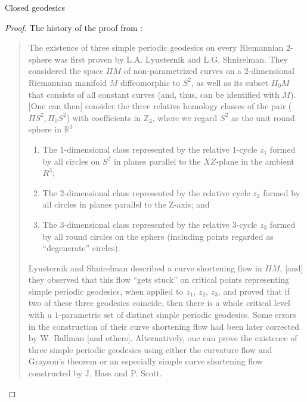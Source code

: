 \documentclass{article}
\theoremstyle{definition}
\theoremstyle{remark}
\begin{document}
\begin{section}{Closed geodesics}
  \begin{proof}
    The history of the proof from \cite{Liokumovich}:
    \begin{quote}
      The existence of three simple periodic geodesics on every Riemannian 2-sphere
      was first proven by L.A. Lyusternik and L.G. Shnirelman. They considered
      the space $\Pi M$ of non-parametrized curves on a $2$-dimensional
      Riemannian manifold $M$ diffeomorphic to $S^2$, as well as its subset
      $\Pi_0M$ that consists of all constant curves (and, thus, can be
      identified with $M$). [One can then] consider the three relative homology
      classes of the pair ($\Pi S^2, \Pi_0S^2$) with coefficients in
      $\mathbb Z_2$, where we regard $S^2$ as the unit round sphere in $\mathbb R^3$
      \begin{enumerate}[1)]
        \item The $1$-dimensional class represented by the relative $1$-cycle $z_1$
        formed by all circles on $S^2$ in planes parallel to the $XZ$-plane in
        the ambient $R^3$;
        \item The $2$-dimensional class represented by the relative cycle $z_2$
        formed by all circles in planes parallel to the Z-axis; and
        \item The $3$-dimensional class represented by the relative $3$-cycle
        $z_3$ formed by all round circles on the sphere (including points regarded
        as “degenerate” circles).
      \end{enumerate}

      Lyusternik and Shnirelman described a curve shortening flow in $\Pi M$, [and]
      they observed that this flow “gets stuck” on critical points representing simple periodic
      geodesics, when applied to $z_1$, $z_2$, $z_3$, and proved that if two of
      these three geodesics coincide, then there is a whole critical level with
      a $1$-parametric set of distinct simple periodic geodesics. Some errors in
      the construction of their curve shortening flow had been later corrected
      by W. Ballman [and others]. Alternatively, one
      can prove the existence of three simple periodic geodesics using either the curvature flow
      and Grayson’s theorem or an especially simple curve shortening flow constructed
      by J. Hass and P. Scott.
    \end{quote}
  \end{proof}


\end{section}
\end{document}
